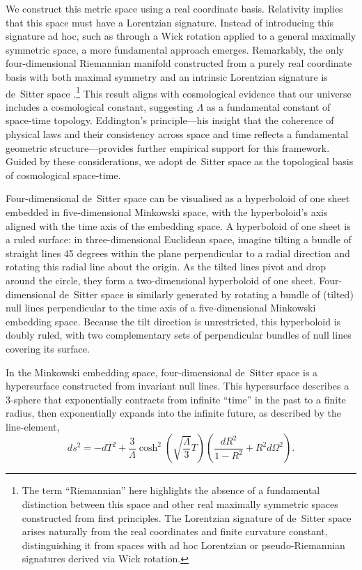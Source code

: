 \documentclass[aps,rmp,groupedaddress,twocolumn,10pt]{revtex4-2}
\begin{document}
We construct this metric space using a real coordinate basis. Relativity implies that this space must have a Lorentzian signature. Instead of introducing this signature ad hoc, such as through a Wick rotation applied to a general maximally symmetric space, a more fundamental approach emerges. Remarkably, the only four-dimensional Riemannian manifold constructed from a purely real coordinate basis with both maximal symmetry and an intrinsic Lorentzian signature is de~Sitter space \cite{Janzen2012}.\footnote{The term ``Riemannian'' here highlights the absence of a fundamental distinction between this space and other real maximally symmetric spaces constructed from first principles. The Lorentzian signature of de~Sitter space arises naturally from the real coordinates and finite curvature constant, distinguishing it from spaces with ad hoc Lorentzian or pseudo-Riemannian signatures derived via Wick rotation.} This result aligns with cosmological evidence that our universe includes a cosmological constant, suggesting $\Lambda$ as a fundamental constant of space-time topology. Eddington's principle---his insight that the coherence of physical laws and their consistency across space and time reflects a fundamental geometric structure---provides further empirical support for this framework. Guided by these considerations, we adopt de~Sitter space as the topological basis of cosmological space-time.

Four-dimensional de~Sitter space can be visualised as a hyperboloid of one sheet embedded in five-dimensional Minkowski space, with the hyperboloid's axis aligned with the time axis of the embedding space. A hyperboloid of one sheet is a ruled surface: in three-dimensional Euclidean space, imagine tilting a bundle of straight lines 45 degrees within the plane perpendicular to a radial direction and rotating this radial line about the origin. As the tilted lines pivot and drop around the circle, they form a two-dimensional hyperboloid of one sheet. Four-dimensional de~Sitter space is similarly generated by rotating a bundle of (tilted) null lines perpendicular to the time axis of a five-dimensional Minkowski embedding space. Because the tilt direction is unrestricted, this hyperboloid is doubly ruled, with two complementary sets of perpendicular bundles of null lines covering its surface.

In the Minkowski embedding space, four-dimensional de~Sitter space is a hypersurface constructed from invariant null lines. This hypersurface describes a 3-sphere that exponentially contracts from infinite ``time'' in the past to a finite radius, then exponentially expands into the infinite future, as described by the line-element, 
\begin{equation}
    ds^2=-dT^2+\frac{3}{\Lambda}\cosh^2\left(\sqrt{\frac{\Lambda}{3}}T\right)\left(\frac{dR^2}{1-R^2}+R^2d\Omega^2\right).\label{eq:dS_hyp}
\end{equation}
\end{document}
